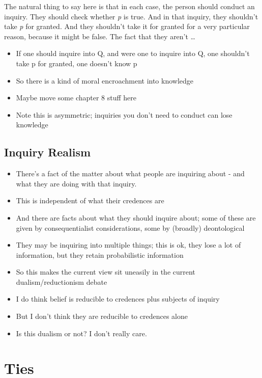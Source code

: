 \documentclass[
  11pt,
]{book}
\providecommand{\tightlist}{%
  \setlength{\itemsep}{0pt}\setlength{\parskip}{0pt}}
\begin{document}
The natural thing to say here is that in each case, the person should conduct an inquiry. They should check whether \emph{p} is true. And in that inquiry, they shouldn't take \emph{p} for granted. And they shouldn't take it for granted for a very particular reason, because it might be false. The fact that they aren't \ldots{}

\begin{itemize}
\tightlist
\item
  If one should inquire into Q, and were one to inquire into Q, one shouldn't take p for granted, one doesn't know p
\item
  So there is a kind of moral encroachment into knowledge
\item
  Maybe move some chapter 8 stuff here
\item
  Note this is asymmetric; inquiries you don't need to conduct can lose knowledge
\end{itemize}

\hypertarget{realism}{%
\section{Inquiry Realism}\label{realism}}

\begin{itemize}
\tightlist
\item
  There's a fact of the matter about what people are inquiring about - and what they are doing with that inquiry.
\item
  This is independent of what their credences are
\item
  And there are facts about what they should inquire about; some of these are given by consequentialist considerations, some by (broadly) deontological
\item
  They may be inquiring into multiple things; this is ok, they lose a lot of information, but they retain probabilistic information
\item
  So this makes the current view sit uneasily in the current dualism/reductionism debate
\item
  I do think belief is reducible to credences plus subjects of inquiry
\item
  But I don't think they are reducible to credences alone
\item
  Is this dualism or not? I don't really care.
\end{itemize}

\hypertarget{ties}{%
\chapter{Ties}\label{ties}}
\end{document}
